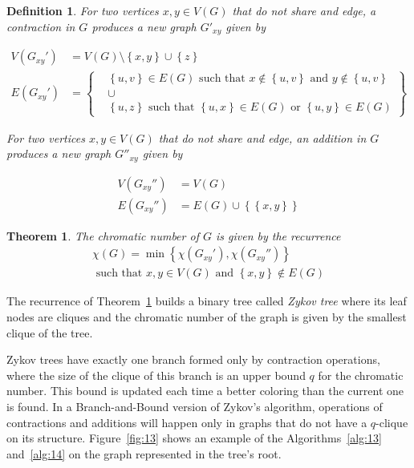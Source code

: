 \documentclass[fleqn,10pt]{SelfArx} %
\newtheorem{teor}{Theorem}
\newtheorem{defin}{Definition}
\newcommand{\chaves}[1] {\ensuremath{{\left \{ {#1} \right \}}}}
\newcommand{\Min}[1] {\ensuremath{\min\chaves{#1}}}
\begin{document}
	\begin{defin}
		For two vertices $x,y \in V(G)$ that do not share and edge, a
		\emph{contraction} in $G$ produces a new graph $G'_{xy}$ given by
		\begin{small}
		\begin{equation*}
		\begin{aligned}
		V(G_{xy}') &= V(G) \setminus \chaves{x,y} \cup \chaves{z}\\
		E(G_{xy}') &= \left\{
		\begin{aligned}
		& \chaves{u,v} \in E(G) \text{ such that } x \notin \chaves{u,v} \text{ and } y \notin \chaves{u,v}\\
		& \cup \\
		& \chaves{u,z} \text{ such that } \chaves{u,x} \in E(G) \text{ or } \chaves{u,y} \in E(G)
		\end{aligned} \right\}
		\end{aligned}
		\end{equation*}\nonumber
		\end{small}
		For two vertices $x,y \in V(G)$ that do not share and edge, an
		\emph{addition} in $G$ produces a new graph $G''_{xy}$ given by
		
		\begin{equation*}
		\begin{aligned}
		V(G_{xy}'') &= V(G)\\
		E(G_{xy}'') &= E(G) \cup \chaves{\chaves{x,y}}
		\end{aligned}
		\end{equation*}
	\end{defin}
	
	\begin{teor}\label{teo:9}
		The chromatic number of $G$ is given by the recurrence
		\begin{multline*}
		\chi(G) 
		=
		\Min{\chi(G_{xy}'),\chi(G_{xy}'')} \\
		\text{ such that } x,y \in V(G) \text{ and } \chaves{x,y} \notin E(G)
		\end{multline*}
	\end{teor}
	
	The recurrence of Theorem~\ref{teo:9} builds a binary tree called
	\emph{Zykov tree} where its leaf nodes are cliques and the chromatic
	number of the graph is given by the smallest clique of the tree.
	
	Zykov trees have exactly one branch formed only by contraction
	operations, where the size of the clique of this branch is an upper
	bound $q$ for the chromatic number. This bound is updated each time a better coloring than the current one is found. In a
	Branch-and-Bound version of Zykov's algorithm, operations
	of contractions and additions will happen only in graphs that do not
	have a $q$-clique on its structure. Figure~\ref{fig:13} shows an
	example of the Algorithms~\ref{alg:13} and~\ref{alg:14} on the graph represented in the tree's root.
	
\end{document}

